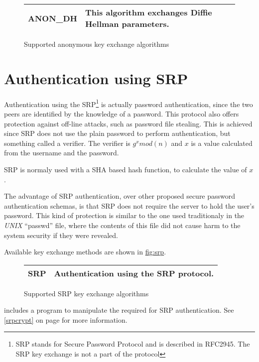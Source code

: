 \begin{figure}[hbtp]
\begin{tabular}{|l|p{9cm}|}

\hline
ANON\_DH & This algorithm exchanges Diffie Hellman parameters. 
\\
\hline
\end{tabular}

\caption{Supported anonymous key exchange algorithms}
\label{fig:anon}

\end{figure}

\section{Authentication using SRP}
Authentication using the SRP\footnote{SRP stands for Secure Password Protocol and 
is described in RFC2945. The SRP key exchange is not a part of the \tlsI{} protocol}
is actually password authentication, since the two peers are identified by the knowledge of a password. 
This protocol also offers protection against off-line attacks, such as password 
file stealing. 
This is achieved since SRP does not use the plain password to perform authentication, but something called a 
verifier. The verifier is $g^{x}mod(n)$ and $x$ is a value calculated
from the username and the password. 
\par SRP is normaly used with a SHA based hash function, to calculate
the value of $x$. 
\par The advantage of SRP authentication, over other proposed secure password 
authentication schemas, is that SRP does not require the server to hold
the user's password. This kind of protection is similar to the one used traditionaly
in the \emph{UNIX} ``passwd'' file, where the contents of this file did not cause
harm to the system security if they were revealed.
\par
Available key exchange methods are shown in \hyperref{figure}{figure }{}{fig:srp}.

\begin{figure}[hbtp]
\begin{tabular}{|l|p{9cm}|}

\hline
SRP & Authentication using the SRP protocol. 
\\
\hline
\end{tabular}

\caption{Supported SRP key exchange algorithms}
\label{fig:srp}

\end{figure}

\gnutls{} includes a program to manipulate the required for SRP
authentication. See \ref{srpcrypt} on page \pageref{srpcrypt} for
more information.
